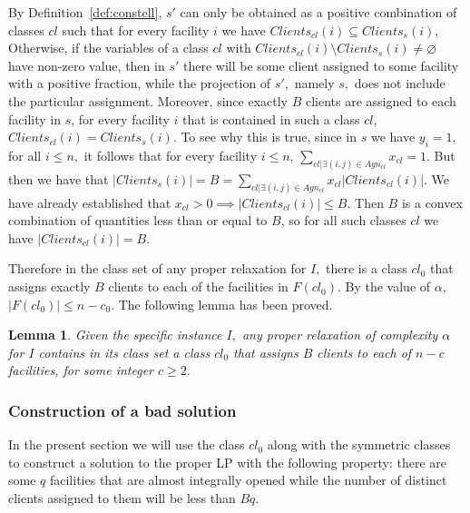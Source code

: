\documentclass[11pt]{article}
\newtheorem{lemma}{Lemma}[section]
\begin{document}
By Definition~\ref{def:constell},
$s'$ can only be obtained as a positive combination of classes $cl$ such that for
every    facility   $i$    we   have    $Clients_{cl}(i)   \subseteq
Clients_s(i)$, Otherwise,  if the variables  of a  class $cl$
with $Clients_{cl}(i)  \setminus  Clients_s(i) \neq \varnothing$ have  non-zero value,
then in $s'$ there will be  some client assigned to
some facility with a positive fraction, while the projection of $s',$ namely $s,$
does  not include  the
particular  assignment.  
Moreover,  since exactly $B$ clients are  assigned to each
facility in  $s$,   for every facility $i$
that   is  contained   in  such   a  class   $cl,$  $Clients_{cl}(i)=
Clients_s(i)$. To see why this  is true, 
since in  $s$ we have $y_i=1,$ for all $i\leq n,$   it follows  that for every facility $i\leq n$,
 $\sum_{cl  | \exists (i,j)  \in  Agn_{cl}} x_{cl}  =1$.  
But  then  we have  that
$|Clients_s(i)|=B=\sum_{cl  |   \exists  (i,j)  \in  Agn_{cl}}
x_{cl}|Clients_{cl}(i)|$.  We have already established   that $x_{cl}>0
\implies |Clients_{cl}(i)|  \leq B$. Then $B$ is  a convex combination
of quantities less than or equal to $B$, so for all such classes $cl$
we have $|Clients_{cl}(i)|=B$.


Therefore
in the class set of any proper relaxation for $I,$ there is 
a class $cl_0$ that assigns exactly $B$ clients to each of  the
facilities in $F(cl_0).$ By the value of $\alpha,$ 
 $|F(cl_0)| \leq n -c_0.$ The following
lemma has been proved. 


\iffalse     --- old version 
\begin{lemma}
There is a class $o$ that is contained in the class set of the proper
relaxation, that assigns $B$ clients to each of $n-c$ for some facilities.
\end{lemma}
\fi 
\begin{lemma}   \label{lemma:existence} 
Given the specific instance $I,$ any proper relaxation  of complexity
$\alpha$ for $I$ contains in its class set a class 
$cl_0$ that assigns $B$ clients to each of $n-c$ facilities, for some
integer  $c \geq 2.$ 
\end{lemma}





\subsubsection{Construction of a bad  solution}  
\label{subsec:badlbfl}

In the present section we will use the class $cl_0$ along with the
symmetric classes to construct a solution to the proper LP with 
the following
property: there are some  $q$ facilities   that
are almost integrally opened while the number of distinct  clients assigned to them will be less than $Bq$. 
\end{document}
